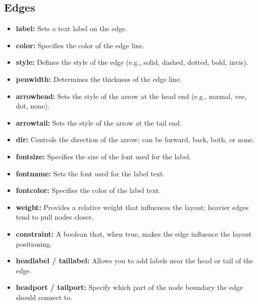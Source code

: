 \documentclass{report}
\begin{document}
     \subsection{Edges}
     \bigbreak \noindent 
     \begin{itemize}
         \item \textbf{label:} Sets a text label on the edge.
         \item \textbf{color:} Specifies the color of the edge line.
         \item \textbf{style:} Defines the style of the edge (e.g., solid, dashed, dotted, bold, invis).
         \item \textbf{penwidth:} Determines the thickness of the edge line.
         \item \textbf{arrowhead:} Sets the style of the arrow at the head end (e.g., normal, vee, dot, none).
         \item \textbf{arrowtail:} Sets the style of the arrow at the tail end.
         \item \textbf{dir:} Controls the direction of the arrow; can be forward, back, both, or none.
         \item \textbf{fontsize:} Specifies the size of the font used for the label.
         \item \textbf{fontname:} Sets the font used for the label text.
         \item \textbf{fontcolor:} Specifies the color of the label text.
         \item \textbf{weight:} Provides a relative weight that influences the layout; heavier edges tend to pull nodes closer.
         \item \textbf{constraint:} A boolean that, when true, makes the edge influence the layout positioning.
         \item \textbf{headlabel / taillabel:} Allows you to add labels near the head or tail of the edge.
         \item \textbf{headport / tailport:} Specify which part of the node boundary the edge should connect to.
     \end{itemize}

     \bigbreak \noindent 
\end{document}
